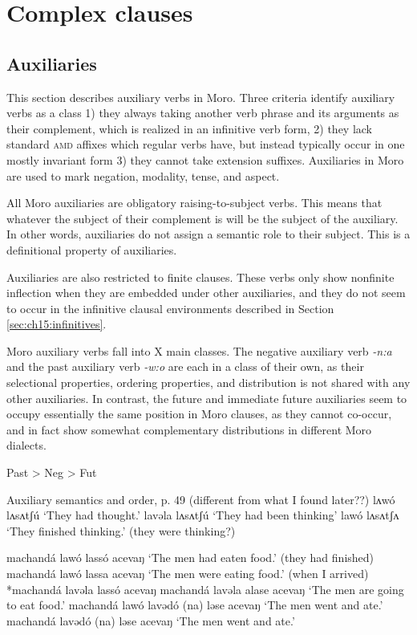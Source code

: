 \part{Complex clauses}

\chapter{Auxiliaries}\label{chapter:auxiliaries}

This section describes auxiliary verbs in Moro. Three criteria identify auxiliary verbs as a class 1) they always taking another verb phrase and its arguments as their complement, which is realized in an infinitive verb form, 2) they lack standard \textsc{amd} affixes which regular verbs have, but instead typically occur in one mostly invariant form 3) they cannot take extension suffixes. Auxiliaries in Moro are used to mark negation, modality, tense, and aspect.

All Moro auxiliaries are obligatory raising-to-subject verbs. This means that whatever the subject of their complement is will be the subject of the auxiliary. In other words, auxiliaries do not assign a semantic role to their subject. This is a definitional property of auxiliaries.

Auxiliaries are also restricted to finite clauses. These verbs only show nonfinite inflection when they are embedded under other auxiliaries, and they do not seem to occur in the infinitive clausal environments described in Section \ref{sec:ch15:infinitives}.

Moro auxiliary verbs fall into X main classes. The negative auxiliary verb \textit{-n:a} and the past auxiliary verb \textit{-w:o} are each in a class of their own, as their selectional properties, ordering properties, and distribution is not shared with any other auxiliaries. In contrast, the future and immediate future auxiliaries seem to occupy essentially the same position in Moro clauses, as they cannot co-occur, and in fact show somewhat complementary distributions in different Moro dialects.

Past > Neg > Fut

Auxiliary semantics and order, p. 49 (different from what I found later??)
lʌwó lʌsʌtʃú					‘They had thought.’
lavəla lʌsʌtʃú					‘They had been thinking’
lawó lʌsʌtʃʌ					‘They finished thinking.’ (they were thinking?)

machandá lawó lassó acevaŋ			‘The men had eaten food.’ (they had finished)
machandá lawó lassa acevaŋ			‘The men were eating food.’ (when I arrived)
*machandá lavəla lassó acevaŋ
machandá lavəla alase acevaŋ			‘The men are going to eat food.’
machandá lawó lavədó (na) ləse acevaŋ	‘The men went and ate.’
machandá lavədó (na) ləse acevaŋ		‘The men went and ate.’

